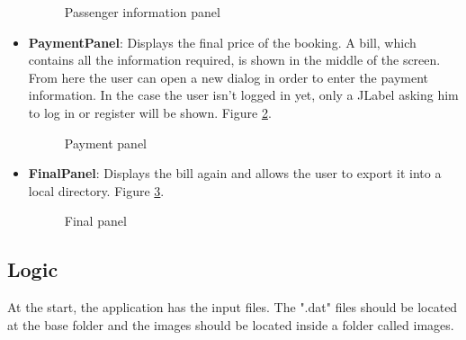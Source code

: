 \documentclass[12pt]{article}
\begin{document}
\begin{itemize}
   	    \begin{figure}
	   	   	\caption{Passenger information panel}
	   	   	\label{fig:passenger}
   	    \end{figure}
   	    \item \textbf{PaymentPanel}: Displays the final price of the booking. A bill, which contains all the information required, is shown in the middle of the screen. From here the user can open a new dialog in order to enter the payment information. In the case the user isn't logged in yet, only a JLabel asking him to log in or register will be shown. Figure \ref{fig:payment}.
   	    \begin{figure}
	   	   	\caption{Payment panel}
	   	   	\label{fig:payment}
   	    \end{figure}
   	    \item \textbf{FinalPanel}: Displays the bill again and allows the user to export it into a local directory. Figure \ref{fig:final}.
   	    \begin{figure}
	   	   	\caption{Final panel}
	   	   	\label{fig:final}
   	    \end{figure}
   \end{itemize}   
   
   \subsection{Logic}
   At the start, the application has the input files. The ".dat" files should be located at the base folder and the images should be located inside a folder called images.
   
\end{document}

